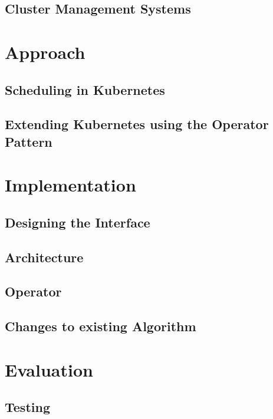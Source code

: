\section{Cluster Management Systems}


\chapter{Approach}
\section{Scheduling in Kubernetes}

\section{Extending Kubernetes using the Operator Pattern}


\chapter{Implementation}
\section{Designing the Interface}

\section{Architecture}

\section{Operator}

\section{Changes to existing Algorithm}


\chapter{Evaluation}
\section{Testing}

